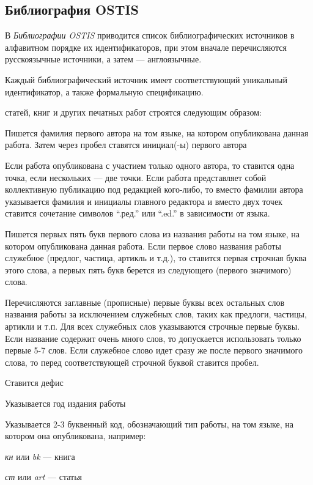 

\begin{partbacktext}
\part*{Библиография OSTIS}
\label{part_biblio}

В \textit{Библиографии OSTIS} приводится список библиографических источников в алфавитном порядке их идентификаторов, при этом вначале перечисляются русскоязычные источники, а затем --- англоязычные.

Каждый библиографический источник имеет соответствующий уникальный идентификатор, а также формальную спецификацию.

 статей, книг и других печатных работ строятся следующим образом:

\begin{textitemize}
	\item Пишется фамилия первого автора на том языке, на котором опубликована данная работа. Затем через пробел ставятся инициал(-ы) первого автора
	\item Если работа опубликована с участием только одного автора, то ставится одна точка, если нескольких --- две точки. Если работа представляет собой коллективную публикацию под редакцией кого-либо, то вместо фамилии автора указывается фамилия и инициалы главного редактора и вместо двух точек ставится сочетание символов ``.ред.'' или ``.ed.'' в зависимости от языка.
	\item Пишется первых пять букв первого слова из названия работы на том языке, на котором опубликована данная работа. Если первое слово названия работы служебное (предлог, частица, артикль и т.д.), то ставится первая строчная буква этого слова, а первых пять букв берется из следующего (первого значимого) слова.
	\item Перечисляются заглавные (прописные) первые буквы всех остальных слов названия работы за исключением служебных слов, таких как предлоги, частицы, артикли и т.п. Для всех служебных слов указываются строчные первые буквы. Если название содержит очень много слов, то допускается использовать только первые 5-7 слов. Если служебное слово идет сразу же после первого значимого слова, то перед соответствующей строчной буквой ставится пробел.
	\item Ставится дефис
	\item Указывается год издания работы
	\item Указывается 2-3 буквенный код, обозначающий тип работы, на том языке, на котором она опубликована, например:
	\begin{textitemize}
		\item \textit{кн} или \textit{bk} --- книга
		\item \textit{ст} или \textit{art} --- статья
	\end{textitemize}
\end{textitemize}


\end{partbacktext}
